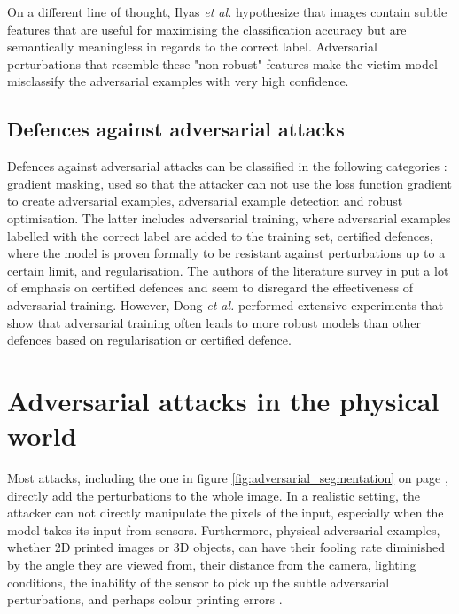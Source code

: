 On a different line of thought, Ilyas \textit{et al.} \cite{adv_examples_bugs} hypothesize that images contain subtle features that are useful for maximising the classification accuracy but are semantically meaningless in regards to the correct label. Adversarial perturbations that resemble these "non-robust" features make the victim model misclassify the adversarial examples with very high confidence.

\subsection{Defences against adversarial attacks}

Defences against adversarial attacks can be classified in the following categories \cite{silva_survey}: gradient masking, used so that the attacker can not use the loss function gradient to create adversarial examples, adversarial example detection and robust optimisation. The latter includes adversarial training, where adversarial examples labelled with the correct label are added to the training set, certified defences, where the model is proven formally to be resistant against perturbations up to a certain limit, and regularisation. The authors of the literature survey in \cite{silva_survey} put a lot of emphasis on certified defences and seem to disregard the effectiveness of adversarial training. However, Dong \textit{et al.} \cite{dong2020benchmarking} performed extensive experiments that show that adversarial training often leads to more robust models than other defences based on regularisation or certified defence.

\section{Adversarial attacks in the physical world}
    \label{sec:physical_attacks_challenges}

Most attacks, including the one in figure \ref{fig:adversarial_segmentation} on page \pageref{fig:adversarial_segmentation}, directly add the perturbations to the whole image. In a realistic setting, the attacker can not directly manipulate the pixels of the input, especially when the model takes its input from sensors. Furthermore, physical adversarial examples, whether 2D printed images or 3D objects, can have their fooling rate diminished by the angle they are viewed from, their distance from the camera, lighting conditions, the inability of the sensor to pick up the subtle adversarial perturbations, and perhaps colour printing errors \cite{kurakin2016adversarial, athalye, evtimov_road_signs}.

